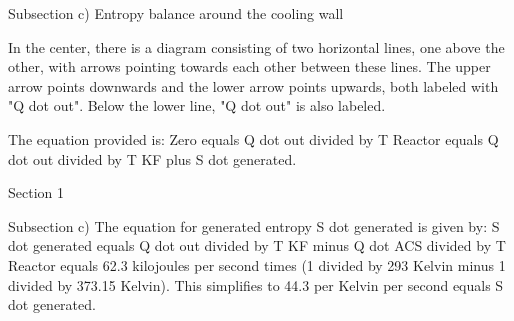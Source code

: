 Subsection c) Entropy balance around the cooling wall

In the center, there is a diagram consisting of two horizontal lines, one above the other, with arrows pointing towards each other between these lines. The upper arrow points downwards and the lower arrow points upwards, both labeled with "Q dot out". Below the lower line, "Q dot out" is also labeled.

The equation provided is:
Zero equals Q dot out divided by T Reactor equals Q dot out divided by T KF plus S dot generated.

Section 1

Subsection c)
The equation for generated entropy S dot generated is given by:
S dot generated equals Q dot out divided by T KF minus Q dot ACS divided by T Reactor equals 62.3 kilojoules per second times (1 divided by 293 Kelvin minus 1 divided by 373.15 Kelvin).
This simplifies to 44.3 per Kelvin per second equals S dot generated.